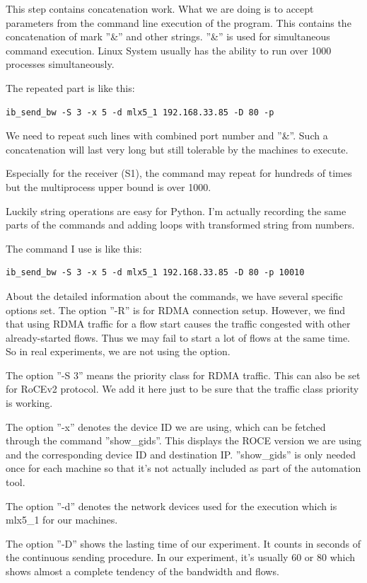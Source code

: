 \documentclass[12pt,a4paper]{article}
\begin{document}
This step contains concatenation work.
What we are doing is to accept parameters from the command line execution of the program.
This contains the concatenation of mark ''\&'' and other strings.
''\&'' is used for simultaneous command execution. Linux System usually has the ability to run over 1000 processes simultaneously.

The repeated part is like this:
\begin{lstlisting}
ib_send_bw -S 3 -x 5 -d mlx5_1 192.168.33.85 -D 80 -p 
\end{lstlisting}
We need to repeat such lines with combined port number and ''\&''.
Such a concatenation will last very long but still tolerable by the machines to execute.

Especially for the receiver (S1), the command may repeat for hundreds of times but the multiprocess upper bound
is over 1000.

Luckily string operations are easy for Python.
I'm actually recording the same parts of the commands and adding loops with transformed string from numbers.

The command I use is like this:
\begin{lstlisting}
ib_send_bw -S 3 -x 5 -d mlx5_1 192.168.33.85 -D 80 -p 10010
\end{lstlisting}

About the detailed information about the commands, we have several specific options set.
The option ''-R'' is for RDMA connection setup. However, we find that using RDMA traffic for a flow start causes
the traffic congested with other already-started flows. Thus we may fail to start a lot of flows at the same time.
So in real experiments, we are not using the option.

The option ''-S 3'' means the priority class for RDMA traffic. This can also be set for RoCEv2 protocol.
We add it here just to be sure that the traffic class priority is working.

The option ''-x'' denotes the device ID we are using, which can be fetched through the command ''show\_gids''.
This displays the ROCE version we are using and the corresponding device ID and destination IP.
''show\_gids'' is only needed once for each machine so that it's not actually included as part of the automation tool.

The option ''-d'' denotes the network devices used for the execution which is mlx5\_1 for our machines.

The option ''-D'' shows the lasting time of our experiment. It counts in seconds of the continuous sending procedure.
In our experiment, it's usually 60 or 80 which shows almost a complete tendency of the bandwidth and flows.
\end{document}
